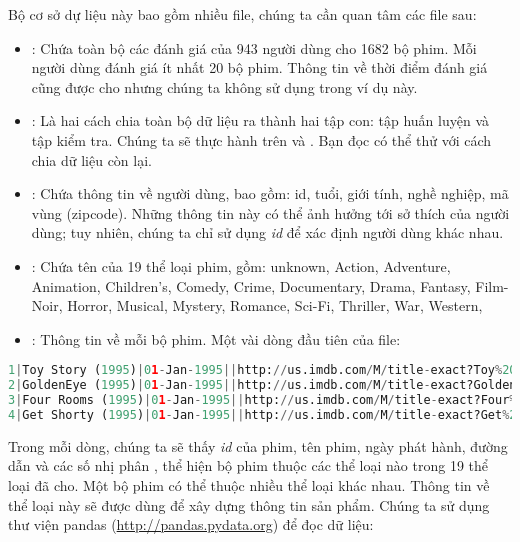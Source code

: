 Bộ cơ sở dự liệu này bao gồm nhiều file, chúng
ta cần quan tâm các file sau:
\begin{itemize}
\item {}: Chứa toàn bộ các đánh giá của 943 người dùng
cho 1682 bộ phim. Mỗi người dùng đánh giá ít nhất 20 bộ phim. Thông tin
về thời điểm đánh giá cũng được cho nhưng chúng ta không sử dụng trong ví dụ
này.
 
\item {}: Là hai cách chia toàn
bộ dữ liệu ra thành hai tập con: tập huấn luyện và tập kiểm tra. Chúng ta
sẽ thực hành trên  và . Bạn đọc có thể thử với cách chia dữ liệu còn lại.
 
\item {}: Chứa thông tin về người dùng, bao gồm: id, tuổi,
giới tính, nghề nghiệp, mã vùng (zipcode). Những thông tin này có thể
ảnh hưởng tới sở thích của người dùng; tuy nhiên, chúng
ta chỉ sử dụng \textit{id} để xác định người dùng khác nhau.
 
\item {}: Chứa tên của 19 thể loại phim, gồm: {unknown, Action, Adventure, Animation, Children's, Comedy, Crime, Documentary, Drama, Fantasy, Film-Noir, Horror, Musical, Mystery, Romance, Sci-Fi, Thriller, War, Western,} 
 
\item {}: Thông tin về mỗi bộ phim. Một vài dòng đầu tiên của file: 
\end{itemize}
\begin{lstlisting}[language=Python]
1|Toy Story (1995)|01-Jan-1995||http://us.imdb.com/M/title-exact?Toy%20Story%20(1995)|0|0|0|1|1|1|0|0|0|0|0|0|0|0|0|0|0|0|0 
2|GoldenEye (1995)|01-Jan-1995||http://us.imdb.com/M/title-exact?GoldenEye%20(1995)|0|1|1|0|0|0|0|0|0|0|0|0|0|0|0|0|1|0|0 
3|Four Rooms (1995)|01-Jan-1995||http://us.imdb.com/M/title-exact?Four%20Rooms%20(1995)|0|0|0|0|0|0|0|0|0|0|0|0|0|0|0|0|1|0|0 
4|Get Shorty (1995)|01-Jan-1995||http://us.imdb.com/M/title-exact?Get%20Shorty%20(1995)|0|1|0|0|0|1|0|0|1|0|0|0|0|0|0|0|0|0|0 
\end{lstlisting}
Trong mỗi dòng, chúng ta sẽ thấy \textit{id} của phim, tên phim, ngày phát hành, đường dẫn và các số nhị phân ,  thể hiện bộ phim thuộc các thể loại nào trong 19 thể loại đã cho. Một bộ phim có thể thuộc nhiều thể loại khác nhau. Thông tin về thể loại này sẽ được dùng để xây dựng thông tin sản phẩm.
\newpage  
Chúng ta sử dụng thư viện
pandas (\url{http://pandas.pydata.org}) để đọc dữ liệu:

